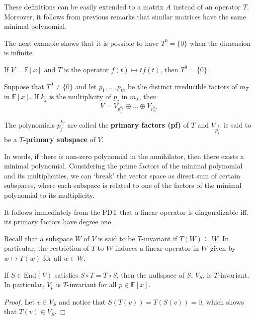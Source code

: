 These definitions can be easily extended to a matrix $A$ instead of an operator $T$. Moreover, it follows from previous remarks that similar matrices have the same minimal polynomial.

The next example shows that it is possible to have $T^0 = \{ 0 \}$ when the dimension is infinite.

\begin{example}
	If $V = \mathbb{F}[x]$ and $T$ is the operator $f(t) \mapsto tf(t)$, then $T^0 = \{ 0 \}$.
\end{example}

\begin{theorem}
	Suppose that $T^0 \neq \{ 0 \}$ and let $p_1, \ldots, p_m$ be the distinct irreducible factors of $m_T$ in $\mathbb{F}[x]$. If $k_j$ is the multiplicity of $p_j$ in $m_T$, then
	\[
		V = V_{p_1^{k_1}} \oplus \ldots \oplus V_{p_m^{k_m}}
	\]
	
	The polynomials $p_j^{k_j}$ are called the \textbf{primary factors (pf)} of $T$ and $V_{p_j^{k_j}}$ is said to be a \textbf{$T$-primary subspace} of $V$.
\end{theorem}

In words, if there is non-zero polynomial in the annihilator, then there exists a minimal polynomial. Considering the prime factors of the minimal polynomial and its multiplicities, we can `break' the vector space as direct sum of certain subspaces, where each subspace is related to one of the factors of the minimal polynomial to its multiplicity.

It follows immediately from the PDT that a linear operator is diagonalizable iff. its primary factors have degree one.

Recall that a subspace $W$ of $V$ is said to be $T$-invariant if $T(W) \subseteq W$. In particular, the restriction of $T$ to $W$ induces a linear operator in $W$ given by $w \mapsto T(w)$ for all $w \in W$.

\begin{lemma}
	If $S \in \text{End}(V)$ satisfies $S \circ T = T \circ S$, then the nullspace of $S$, $V_S$, is $T$-invariant. In particular, $V_p$ is $T$-invariant for all $p \in \mathbb{F}[x]$.
\end{lemma}

\begin{proof}
	Let $v \in V_S$ and notice that $S(T(v)) = T(S(v)) = 0$, which shows that $T(v) \in V_S$.
\end{proof}

